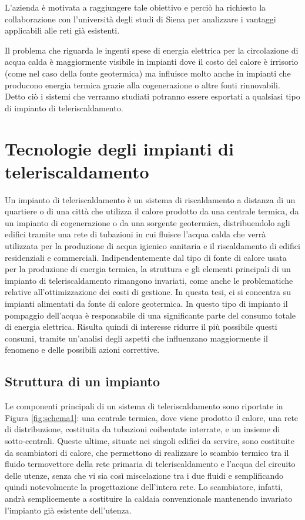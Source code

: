 \documentclass[laurea,oneside,11pt]{USiena_tesiLM}
\begin{document}
L'azienda è motivata a raggiungere tale obiettivo e perciò ha richiesto la collaborazione con l'università degli studi di Siena per analizzare i vantaggi applicabili alle reti già esistenti.

Il problema che riguarda le ingenti spese di energia elettrica per la circolazione di acqua calda è maggiormente visibile in impianti dove il costo del calore è irrisorio (come nel caso della fonte geotermica) ma influisce molto anche in impianti che producono energia termica grazie alla cogenerazione o altre fonti rinnovabili. Detto ciò i sistemi che verranno studiati potranno essere esportati a qualsiasi tipo di impianto di teleriscaldamento.


\chapter{Tecnologie degli impianti di teleriscaldamento}
Un impianto di teleriscaldamento è un  sistema di riscaldamento a distanza di un quartiere o di una città 
che utilizza il calore prodotto da una centrale termica, da un impianto di cogenerazione o da una sorgente geotermica, distribuendolo agli edifici tramite una rete di tubazioni in cui fluisce l'acqua calda che verrà utilizzata per la produzione di acqua igienico sanitaria e il riscaldamento di edifici residenziali e commerciali. Indipendentemente dal tipo di fonte di calore usata per la produzione di energia termica, la struttura e gli elementi principali di un impianto di teleriscaldamento rimangono invariati, come anche le problematiche relative all'ottimizzazione dei costi di gestione. In questa tesi, ci si concentra su impianti alimentati da fonte di calore geotermica. In questo tipo di impianto il pompaggio dell'acqua è responsabile di una significante parte del consumo totale di energia elettrica. Risulta quindi di interesse ridurre il più possibile questi consumi, tramite un'analisi degli aspetti che influenzano maggiormente il fenomeno e delle possibili azioni correttive. 

\section{Struttura di un impianto}
Le componenti principali di un sistema di teleriscaldamento sono  riportate in Figura \ref{fig:schema1}: una centrale termica, dove viene prodotto il calore, una rete di distribuzione, costituita da tubazioni 
coibentate interrate, e un insieme di sotto-centrali. Queste ultime, situate nei singoli 
edifici da servire, sono costituite da scambiatori di calore, che permettono di realizzare 
lo scambio termico tra il fluido termovettore  della rete primaria di teleriscaldamento e l'acqua del circuito delle utenze, senza che vi sia così miscelazione tra i due fluidi e  semplificando quindi notevolmente la progettazione dell'intera rete. Lo scambiatore, infatti, andrà semplicemente a sostituire la  caldaia convenzionale mantenendo invariato l'impianto già esistente dell'utenza.
\end{document}
